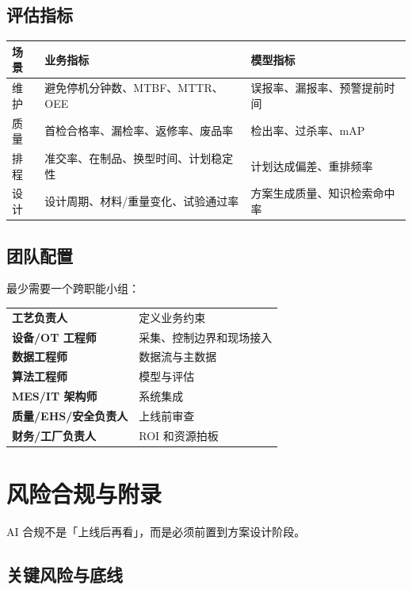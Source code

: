\documentclass[a4paper,12pt]{ctexart}
\begin{document}
\subsection{评估指标}

\begin{tabular}{p{3cm}p{6cm}p{6cm}}
\toprule
\textbf{场景} & \textbf{业务指标} & \textbf{模型指标} \\
\midrule
维护 & 避免停机分钟数、MTBF、MTTR、OEE & 误报率、漏报率、预警提前时间 \\
质量 & 首检合格率、漏检率、返修率、废品率 & 检出率、过杀率、mAP \\
排程 & 准交率、在制品、换型时间、计划稳定性 & 计划达成偏差、重排频率 \\
设计 & 设计周期、材料/重量变化、试验通过率 & 方案生成质量、知识检索命中率 \\
\bottomrule
\end{tabular}

\subsection{团队配置}

最少需要一个跨职能小组：

\begin{tabular}{>{\bfseries}lp{12cm}}
工艺负责人 & 定义业务约束 \\
设备/OT 工程师 & 采集、控制边界和现场接入 \\
数据工程师 & 数据流与主数据 \\
算法工程师 & 模型与评估 \\
MES/IT 架构师 & 系统集成 \\
质量/EHS/安全负责人 & 上线前审查 \\
财务/工厂负责人 & ROI 和资源拍板 \\
\end{tabular}

\section{风险合规与附录}

AI 合规不是「上线后再看」，而是必须前置到方案设计阶段。

\subsection{关键风险与底线}
\end{document}
